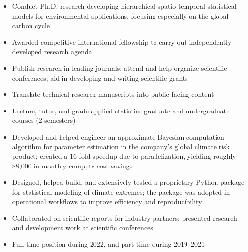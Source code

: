 \documentclass[10pt,letterpaper,ragged2e,withhyper]{altacv}
\begin{document}
\vspace{0.1em}
\begin{paracol}{2}



  \begin{itemize}
    \item Conduct Ph.D. research developing hierarchical spatio-temporal statistical models for environmental applications, focusing especially on the global carbon cycle
    \item Awarded competitive international fellowship to carry out independently-developed research agenda
    \item Publish research in leading journals; attend and help organize scientific conferences; aid in developing and writing scientific grants
    \item Translate technical research manuscripts into public-facing content
    \item Lecture, tutor, and grade applied statistics graduate and undergraduate courses (2 semesters)
  \end{itemize}

  \vspace{-0.75em}
  \divider

  \begin{itemize}
    \item Developed and helped engineer an approximate Bayesian computation algorithm for parameter estimation in the company's global climate risk product; created a 16-fold speedup due to parallelization, yielding roughly \$8,000 in monthly compute cost savings
    \item Designed, helped build, and extensively tested a proprietary Python package for statistical modeling of climate extremes; the package was adopted in operational workflows to improve efficiency and reproducibility
    \item Collaborated on scientific reports for industry partners; presented research and development work at scientific conferences
    \item Full-time position during 2022, and part-time during 2019--2021
  \end{itemize}


\end{paracol}
\end{document}
